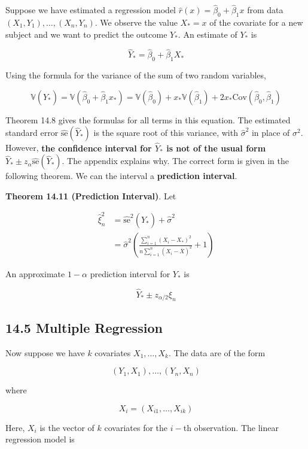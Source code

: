 Suppose we have estimated a regression model
\(\hat{r}(x) = \hat{\beta}_0 + \hat{\beta}_1 x\) from data
\((X_1, Y_1), \dots, (X_n, Y_n)\). We observe the value \(X_* = x\) of
the covariate for a new subject and we want to predict the outcome
\(Y_*\). An estimate of \(Y_*\) is

\[ \hat{Y}_* = \hat{\beta}_0 + \hat{\beta}_1 X_*\]

Using the formula for the variance of the sum of two random variables,

\[ \mathbb{V}(\hat{Y}_*) = \mathbb{V}(\hat{\beta}_0 + \hat{\beta}_1 x_*) = \mathbb{V}(\hat{\beta}_0) + x_* \mathbb{V}(\hat{\beta}_1) + 2 x_* \text{Cov}(\hat{\beta}_0, \hat{\beta}_1) \]

Theorem 14.8 gives the formulas for all terms in this equation. The
estimated standard error \(\hat{\text{se}}(\hat{Y}_*)\) is the square
root of this variance, with \(\hat{\sigma}^2\) in place of \(\sigma^2\).
However, \textbf{the confidence interval for \(\hat{Y}_*\) is not of the
usual form} \(\hat{Y}_* \pm z_{\alpha} \hat{\text{se}}(\hat{Y}_*)\). The
appendix explains why. The correct form is given in the following
theorem. We can the interval a \textbf{prediction interval}.

\textbf{Theorem 14.11 (Prediction Interval)}. Let

\begin{align}
\hat{\xi}_n^2 &= \hat{\text{se}}^2(\hat{Y}_*) + \hat{\sigma}^2 \\
&= \hat{\sigma}^2 \left(\frac{\sum_{i=1}^n (X_i - X_*)^2}{n \sum_{i=1}^n (X_i - \overline{X})^2} + 1 \right)
\end{align}

An approximate \(1 - \alpha\) prediction interval for \(Y_*\) is

\[ \hat{Y}_* \pm z_{\alpha/2} \xi_n\]

\subsection{14.5 Multiple Regression}\label{multiple-regression}

Now suppose we have \(k\) covariates \(X_1, \dots, X_k\). The data are
of the form

\[(Y_1, X_1), \dots, (Y_n, X_n)\]

where

\[ X_i = (X_{i1}, \dots, X_{ik}) \]

Here, \(X_i\) is the vector of \(k\) covariates for the \(i-\)th
observation. The linear regression model is

